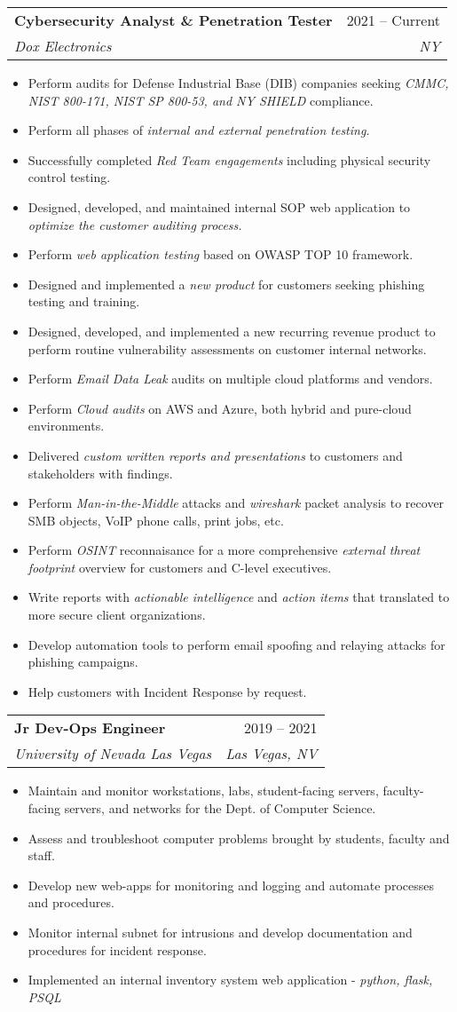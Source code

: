 \documentclass[letterpaper,11pt]{article}
\makeatletter
\newcommand{\resumeItem}[1]{
  \item\small{
    {#1 \vspace{-2pt}}
  }
}
\newcommand{\resumeSubheading}[4]{
  \vspace{-2pt}\item
    \begin{tabular*}{0.97\textwidth}[t]{l@{\extracolsep{\fill}}r}
      \textbf{#1} & #2 \\
      \textit{\small#3} & \textit{\small #4} \\
    \end{tabular*}\vspace{-7pt}
}
\newcommand{\resumeItemListStart}{\begin{itemize}}
\newcommand{\resumeItemListEnd}{\end{itemize}\vspace{-5pt}}
\makeatother
\begin{document}
    \resumeSubheading
      {Cybersecurity Analyst \& Penetration Tester}{2021 -- Current}
      {Dox Electronics}{NY}
      \resumeItemListStart
        \resumeItem{Perform audits for Defense Industrial Base (DIB) companies seeking \emph{CMMC, NIST 800-171, NIST SP 800-53, and NY SHIELD} compliance.}
        \resumeItem{Perform all phases of \emph{internal and external penetration testing.}}
        \resumeItem{Successfully completed \emph{Red Team engagements} including physical security control testing.}
        \resumeItem{Designed, developed, and maintained internal SOP web application to \emph{optimize the customer auditing process.}}
        \resumeItem{Perform \emph{web application testing} based on OWASP TOP 10 framework.}
        \resumeItem{Designed and implemented a \emph{new product} for customers seeking phishing testing and training.}
        \resumeItem{Designed, developed, and implemented a new recurring revenue product to perform routine vulnerability assessments on customer internal networks.}
        \resumeItem{Perform \emph{Email Data Leak} audits on multiple cloud platforms and vendors.}
        \resumeItem{Perform \emph{Cloud audits} on AWS and Azure, both hybrid and pure-cloud environments.}
        \resumeItem{Delivered  \emph{custom written reports and presentations} to customers and stakeholders with findings.}
        \resumeItem{Perform \emph{Man-in-the-Middle} attacks and \emph{wireshark} packet analysis to recover SMB objects, VoIP phone calls, print jobs, etc.}
        \resumeItem{Perform \emph{OSINT} reconnaisance for a more comprehensive \emph{external threat footprint} overview for customers and C-level executives.}
        \resumeItem{Write reports with \emph{actionable intelligence} and \emph{action items} that translated to more secure client organizations.}
        \resumeItem{Develop automation tools to perform email spoofing and relaying attacks for phishing campaigns.}
        \resumeItem{Help customers with Incident Response by request.}
    \resumeItemListEnd

    \resumeSubheading
      {Jr Dev-Ops Engineer}{2019 -- 2021}
      {University of Nevada Las Vegas}{Las Vegas, NV}
      \resumeItemListStart
        \resumeItem{Maintain and monitor workstations, labs, student-facing servers, faculty-facing servers, and networks for the Dept. of Computer Science.}
        \resumeItem{Assess and troubleshoot computer problems brought by students, faculty and staff.}
        \resumeItem{Develop new web-apps for monitoring and logging and automate processes and procedures.}
        \resumeItem{Monitor internal subnet for intrusions and develop documentation and procedures for incident response.}
        \resumeItem{Implemented an internal inventory system web application - \emph{python, flask, PSQL}}
    \resumeItemListEnd
\end{document}
